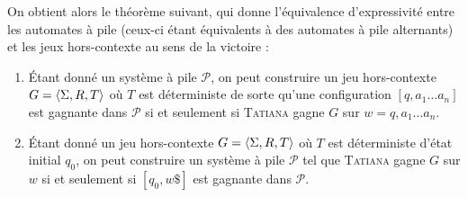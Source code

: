\documentclass{cours}
\begin{document}
On obtient alors le théorème suivant, qui donne l'équivalence d'expressivité entre les automates à pile (ceux-ci étant équivalents à des automates à pile alternants) et les jeux hors-contexte au sens de la victoire : 
\begin{theorem}
    \begin{enumerate}
        \item Étant donné un système à pile $\mathcal{P}$, on peut construire un jeu hors-contexte $G = \left\langle \Sigma, R, T \right\rangle$ où $T$ est déterministe de sorte qu'une configuration $\left[q, a_{1}\ldots a_{n}\right]$ est gagnante dans $\mathcal{P}$ si et seulement si \textsc{Tatiana} gagne $G$ sur $w = q,a_{1}\ldots a_{n}$. 
        \item Étant donné un jeu hors-contexte $G = \left\langle \Sigma, R, T \right\rangle$ où $T$ est déterministe d'état initial $q_{0}$, on peut construire un système à pile $\mathcal{P}$ tel que \textsc{Tatiana} gagne $G$ sur $w$ si et seulement si $\left[q_{0}, w\$\right]$ est gagnante dans $\mathcal{P}$.
    \end{enumerate}
\end{theorem}
\end{document}
